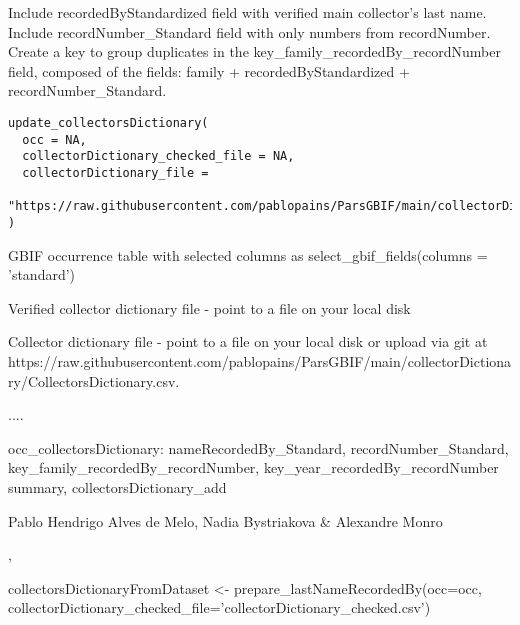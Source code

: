 \documentclass[a4paper]{book}
\begin{document}
%
\begin{Description}
Include recordedByStandardized field with verified main collector's last name.
Include recordNumber\_Standard field with only numbers from recordNumber.
Create a key to group duplicates in the key\_family\_recordedBy\_recordNumber field, composed of the fields: family + recordedByStandardized + recordNumber\_Standard.
\end{Description}
%
\begin{Usage}
\begin{verbatim}
update_collectorsDictionary(
  occ = NA,
  collectorDictionary_checked_file = NA,
  collectorDictionary_file =
    "https://raw.githubusercontent.com/pablopains/ParsGBIF/main/collectorDictionary/CollectorsDictionary.csv"
)
\end{verbatim}
\end{Usage}
%
\begin{Arguments}
\begin{ldescription}
\item[\code{occ}] GBIF occurrence table with selected columns as select\_gbif\_fields(columns = 'standard')

\item[\code{collectorDictionary\_checked\_file}] Verified collector dictionary file - point to a file on your local disk

\item[\code{collectorDictionary\_file}] Collector dictionary file - point to a file on your local disk or upload via git at https://raw.githubusercontent.com/pablopains/ParsGBIF/main/collectorDictionary/CollectorsDictionary.csv.
\end{ldescription}
\end{Arguments}
%
\begin{Details}
....
\end{Details}
%
\begin{Value}
occ\_collectorsDictionary: nameRecordedBy\_Standard, recordNumber\_Standard, key\_family\_recordedBy\_recordNumber, key\_year\_recordedBy\_recordNumber
summary,
collectorsDictionary\_add
\end{Value}
%
\begin{Author}
Pablo Hendrigo Alves de Melo,
Nadia Bystriakova \&
Alexandre Monro
\end{Author}
%
\begin{SeeAlso}
, 
\end{SeeAlso}
%
\begin{Examples}
\begin{ExampleCode}

collectorsDictionaryFromDataset <- prepare_lastNameRecordedBy(occ=occ,
                                                              collectorDictionary_checked_file='collectorDictionary_checked.csv')


\end{ExampleCode}
\end{Examples}
\printindex{}
\end{document}
